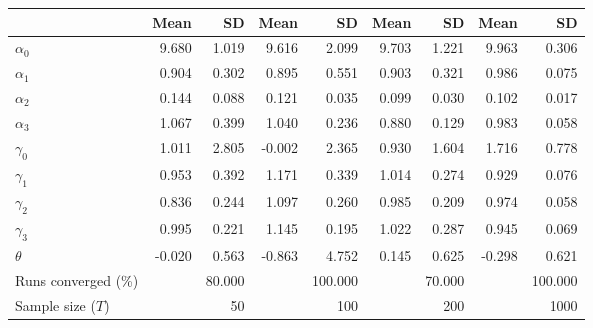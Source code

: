 
\begin{tabular}[t]{lrrrrrrrr}
\toprule
  & Mean & SD & Mean  & SD  & Mean   & SD   & Mean    & SD   \\
\midrule
$\alpha_{0}$ & 9.680 & 1.019 & 9.616 & 2.099 & 9.703 & 1.221 & 9.963 & 0.306\\
$\alpha_{1}$ & 0.904 & 0.302 & 0.895 & 0.551 & 0.903 & 0.321 & 0.986 & 0.075\\
$\alpha_{2}$ & 0.144 & 0.088 & 0.121 & 0.035 & 0.099 & 0.030 & 0.102 & 0.017\\
$\alpha_{3}$ & 1.067 & 0.399 & 1.040 & 0.236 & 0.880 & 0.129 & 0.983 & 0.058\\
$\gamma_{0}$ & 1.011 & 2.805 & -0.002 & 2.365 & 0.930 & 1.604 & 1.716 & 0.778\\
$\gamma_{1}$ & 0.953 & 0.392 & 1.171 & 0.339 & 1.014 & 0.274 & 0.929 & 0.076\\
$\gamma_{2}$ & 0.836 & 0.244 & 1.097 & 0.260 & 0.985 & 0.209 & 0.974 & 0.058\\
$\gamma_{3}$ & 0.995 & 0.221 & 1.145 & 0.195 & 1.022 & 0.287 & 0.945 & 0.069\\
$\theta$ & -0.020 & 0.563 & -0.863 & 4.752 & 0.145 & 0.625 & -0.298 & 0.621\\
Runs converged (\%) &  & 80.000 &  & 100.000 &  & 70.000 &  & 100.000\\
Sample size ($T$) &  & 50 &  & 100 &  & 200 &  & 1000\\
\bottomrule
\end{tabular}
